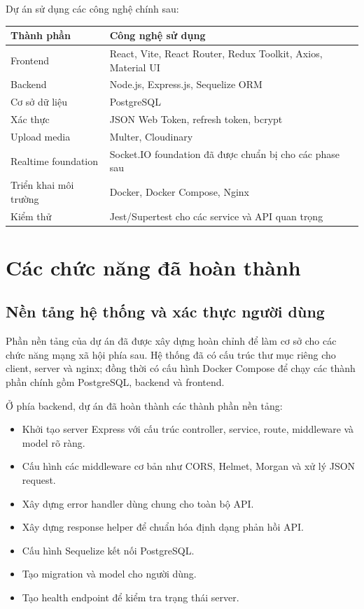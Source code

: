 \documentclass[12pt,a4paper]{article}
\begin{document}
Dự án sử dụng các công nghệ chính sau:

\begin{longtable}{|p{4cm}|p{10cm}|}
\hline
\textbf{Thành phần} & \textbf{Công nghệ sử dụng} \\
\hline
Frontend & React, Vite, React Router, Redux Toolkit, Axios, Material UI \\
\hline
Backend & Node.js, Express.js, Sequelize ORM \\
\hline
Cơ sở dữ liệu & PostgreSQL \\
\hline
Xác thực & JSON Web Token, refresh token, bcrypt \\
\hline
Upload media & Multer, Cloudinary \\
\hline
Realtime foundation & Socket.IO foundation đã được chuẩn bị cho các phase sau \\
\hline
Triển khai môi trường & Docker, Docker Compose, Nginx \\
\hline
Kiểm thử & Jest/Supertest cho các service và API quan trọng \\
\hline
\end{longtable}

\section{Các chức năng đã hoàn thành}

\subsection{Nền tảng hệ thống và xác thực người dùng}

Phần nền tảng của dự án đã được xây dựng hoàn chỉnh để làm cơ sở cho các chức năng mạng xã hội phía sau. Hệ thống đã có cấu trúc thư mục riêng cho client, server và nginx; đồng thời có cấu hình Docker Compose để chạy các thành phần chính gồm PostgreSQL, backend và frontend.

Ở phía backend, dự án đã hoàn thành các thành phần nền tảng:

\begin{itemize}
  \item Khởi tạo server Express với cấu trúc controller, service, route, middleware và model rõ ràng.
  \item Cấu hình các middleware cơ bản như CORS, Helmet, Morgan và xử lý JSON request.
  \item Xây dựng error handler dùng chung cho toàn bộ API.
  \item Xây dựng response helper để chuẩn hóa định dạng phản hồi API.
  \item Cấu hình Sequelize kết nối PostgreSQL.
  \item Tạo migration và model cho người dùng.
  \item Tạo health endpoint để kiểm tra trạng thái server.
\end{itemize}
\end{document}
